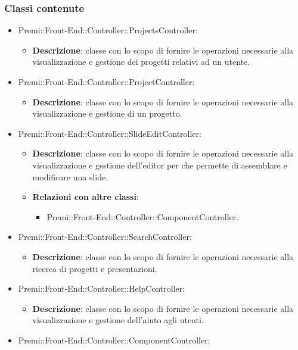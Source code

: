 	\subsubsection*{Classi contenute}
		\begin{itemize}
		 \item Premi::Front-End::Controller::ProjectsController:
			\begin{itemize}
				\item \textbf{Descrizione}: classe con lo scopo di fornire le operazioni necessarie alla visualizzazione e gestione dei progetti relativi ad un utente.
			\end{itemize}
		\item  Premi::Front-End::Controller::ProjectController: 
			 \begin{itemize}
				\item \textbf{Descrizione}: classe con lo scopo di fornire le operazioni necessarie alla visualizzazione e gestione di un progetto.
			\end{itemize}
		\item  Premi::Front-End::Controller::SlideEditController: 
			 \begin{itemize}
				\item \textbf{Descrizione}: classe con lo scopo di fornire le operazioni necessarie alla visualizzazione e gestione dell'editor per che permette di assemblare e modificare una slide.
				\item \textbf{Relazioni con altre classi}:
				\begin{itemize}
					\item Premi::Front-End::Controller::ComponentController.
				\end{itemize}
			\end{itemize}
		\item  Premi::Front-End::Controller::SearchController: 
			 \begin{itemize}
				\item \textbf{Descrizione}: classe con lo scopo di fornire le operazioni necessarie alla ricerca di progetti e presentazioni.
			\end{itemize}
		\item  Premi::Front-End::Controller::HelpController: 
			 \begin{itemize}
				\item \textbf{Descrizione}: classe con lo scopo di fornire le operazioni necessarie alla visualizzazione e gestione dell'aiuto agli utenti.
			\end{itemize}
		\item  Premi::Front-End::Controller::ComponentController: 

\end{itemize}
